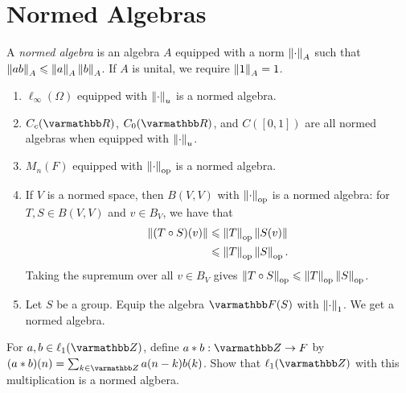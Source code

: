     

\section{Normed Algebras}
    \begin{definition}
        A \textit{normed algebra} is an algebra $A$ equipped with a norm $\left\lVert \cdot \right\rVert_A$ such that $\left\lVert ab \right\rVert_A \leqslant \left\lVert a \right\rVert_A \left\lVert b \right\rVert_A$. If $A$ is unital, we require $\left\lVert 1 \right\rVert_A = 1$.
    \end{definition}

    \begin{example}
        \phantom{a}
        \begin{enumerate}[label = (\arabic*),itemsep=1pt,topsep=3pt]
            \item $\ell_\infty(\Omega)$ equipped with $\left\lVert \cdot \right\rVert_u$ is a normed algebra.
            \item $C_c(\bfR)$, $C_0(\bfR)$, and $C([0,1])$ are all normed algebras when equipped with $\left\lVert \cdot \right\rVert_u$.
            \item $M_n(F)$ equipped with $\left\lVert \cdot \right\rVert_\text{op}$ is a normed algebra.
            \item If $V$ is a normed space, then $B(V,V)$ with $\left\lVert \cdot \right\rVert_\text{op}$ is a normed algebra: for $T,S \in B(V,V)$ and $v \in B_V$, we have that
                \begin{equation*}
                \begin{split}
                    \left\lVert (T \circ S)(v) \right\rVert
                    & \leqslant \left\lVert T \right\rVert_\text{op}\left\lVert S(v) \right\rVert \\
                    & \leqslant \left\lVert T \right\rVert_\text{op}\left\lVert S \right\rVert_\text{op}.
                \end{split}
                \end{equation*}
            Taking the supremum over all $v \in B_V$ gives $\left\lVert T \circ S \right\rVert_\text{op} \leqslant \left\lVert T \right\rVert_\text{op}\left\lVert S \right\rVert_\text{op}$.

            \item Let $S$ be a group. Equip the algebra $\bfF(S)$ with $\left\lVert \cdot \right\rVert_1$. We get a normed algebra.
        \end{enumerate}
    \end{example}

    \begin{exercise}
        For $a,b \in \ell_1(\bfZ)$, define $a\ast b :\bfZ \rightarrow F$ by $(a \ast b)(n) = \sum_{k \in \bfZ}a(n-k)b(k)$. Show that $\ell_1(\bfZ)$ with this multiplication is a normed algbera.
    \end{exercise}
    

    




    
    
